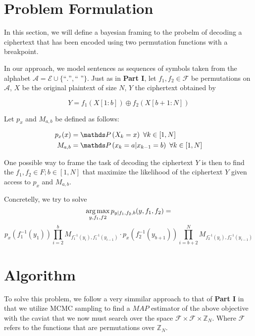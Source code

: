 \documentclass{siamart190516}
\begin{document}
\maketitle

\section{Problem Formulation}
In this section, we will define a bayesian framing to the probelm of decoding a ciphertext that has been encoded using two permutation functions with a breakpoint.

In our approach, we model sentences as sequences of symbols taken from the alphabet $\mathcal{A} = \mathcal{E} \cup \{\text{``.''}, \text{`` ''}\}$. Just as in \textbf{Part I}, let $f_1, f_2 \in \mathcal{F}$ be permutations on $\mathcal{A}$, $X$ be the original plaintext of size $N$, $Y$ the ciphertext obtained by

\[
  Y = f_1(X[1:b]) \oplus f_2(X[b + 1:N])
\]

Let $p_{x}$ and $M_{a, b}$ be defined as follows:

\begin{align}
  p_{x}(x) & = \prob{X_k = x} \text{  }\forall k \in [1, N]                 \\
  M_{a, b} & = \prob{x_k = a | x_{k - 1} = b} \text{  }\forall k \in [1, N]
\end{align}

One possible way to frame the task of decoding the ciphertext $Y$ is then to find the $f_1, f_2 \in F; b \in [1,N]$ that maximize the likelihood of the ciphertext $Y$ given access to $p_x$ and $M_{a, b}$.

Concretelly, we try to solve
\[\operatorname*{arg\,max}_{y, f_1, f2} p_{y | f_1, f_2, b}(y, f_1, f_2)= \]
\[p_{x}(f_1^{-1}(y_1)) \prod_{i = 2}^{b} M_{f_1^{-1}(y_i), f_1^{-1}(y_{i - 1})} \cdot p_{x}(f_2^{-1}(y_{b + 1})) \prod_{i = b + 2}^{N} M_{f_2^{-1}(y_i), f_2^{-1}(y_{i - 1})}
\]


\section{Algorithm}
To solve this problem, we follow a very simmilar approach to that of \textbf{Part I} in that we utilize MCMC sampling to find a $MAP$ estimator of the above objective with the caviat that we now must search over the space $\mathcal{F} \times \mathcal{F} \times \mathbb{Z}_N$. Where $\mathcal{F}$ refers to the functions that are permutations over $\mathbb{Z}_N$.
\end{document}
